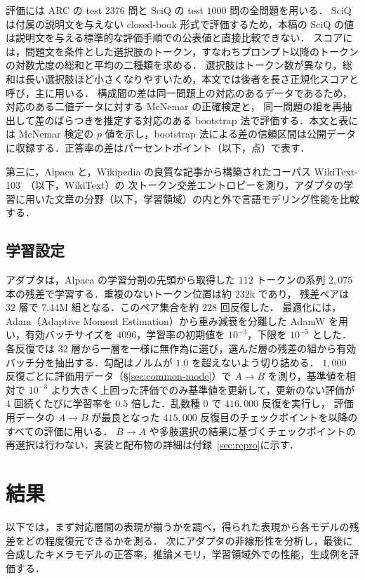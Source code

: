 \documentclass[techrep,noauthor]{ipsj}
\begin{document}
評価には ARC の test $2376$ 問と SciQ の test $1000$ 問の全問題を用いる．
SciQ は付属の説明文を与えない closed-book 形式で評価するため，本稿の SciQ の値は説明文を与える標準的な評価手順での公表値と直接比較できない．
スコアには，問題文を条件とした選択肢のトークン，すなわちプロンプト以降のトークンの対数尤度の総和と平均の二種類を求める．
選択肢はトークン数が異なり，総和は長い選択肢ほど小さくなりやすいため，本文では後者を長さ正規化スコアと呼び，主に用いる．
構成間の差は同一問題上の対応のあるデータであるため，対応のある二値データに対する McNemar の正確検定と，
同一問題の組を再抽出して差のばらつきを推定する対応のある bootstrap 法で評価する．本文と表には McNemar 検定の $p$ 値を示し，bootstrap 法による差の信頼区間は公開データに収録する．正答率の差はパーセントポイント（以下，点）で表す．

第三に，Alpaca と，Wikipedia の良質な記事から構築されたコーパス WikiText-103~\cite{merity2017pointer}（以下，WikiText）の
次トークン交差エントロピーを測り，アダプタの学習に用いた文章の分野（以下，学習領域）の内と外で言語モデリング性能を比較する．

\subsection{学習設定}\label{sec:train}
アダプタは，Alpaca の学習分割の先頭から取得した $112$ トークンの系列 $2{,}075$ 本の残差で学習する．重複のないトークン位置は約 $232$k であり，
残差ペアは $32$ 層で $7.44$M 組となる．このペア集合を約 $228$ 回反復した．
最適化には，Adam（Adaptive Moment Estimation）から重み減衰を分離した AdamW を用い，有効バッチサイズを $4096$，学習率の初期値を $10^{-3}$，下限を $10^{-5}$ とした．
各反復では $32$ 層から一層を一様に無作為に選び，選んだ層の残差の組から有効バッチ分を抽出する．勾配はノルムが $1.0$ を超えないよう切り詰める．
$1{,}000$ 反復ごとに評価用データ（\S\ref{sec:common-mode}）で $A\!\to\!B$ を測り，基準値を相対で $10^{-3}$ より大きく上回った評価でのみ基準値を更新して，更新のない評価が $4$ 回続くたびに学習率を $0.5$ 倍した．乱数種 $0$ で $416{,}000$ 反復を実行し，
評価用データの $A\!\to\!B$ が最良となった $415{,}000$ 反復目のチェックポイントを以降のすべての評価に用いる．
$B\!\to\!A$ や多肢選択の結果に基づくチェックポイントの再選択は行わない．実装と配布物の詳細は付録~\ref{sec:repro}に示す．


\section{結果}\label{sec:results}
以下では，まず対応層間の表現が揃うかを調べ，得られた表現から各モデルの残差をどの程度復元できるかを測る．
次にアダプタの非線形性を分析し，最後に合成したキメラモデルの正答率，推論メモリ，学習領域外での性能，生成例を評価する．
\end{document}
